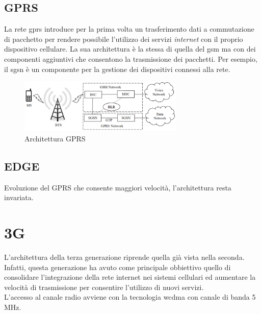 \clearpage

\subsection{GPRS}
La rete \gls{gprs}\cite{gprs-edge} introduce per la prima volta un trasferimento dati a commutazione di pacchetto per rendere 
possibile l'utilizzo dei servizi \textit{internet} con il proprio dispositivo cellulare\cite{gsm-architecture}.
La sua architettura è la stessa di quella del \gls{gsm} ma con dei componenti aggiuntivi che consentono la trasmissione dei pacchetti. 
Per esempio, il \gls{sgsn} è un componente per la gestione dei dispositivi connessi alla rete.
\begin{figure}[ht]
    \centering
    \includegraphics[width=0.7\textwidth]{images/2g-gprs.png}
    \caption{Architettura GPRS}
\end{figure}
\subsection{EDGE}
Evoluzione del GPRS che consente maggiori velocità, l'architettura resta invariata\cite{gprs-edge}.

\clearpage

\section{3G}
L'architettura della terza generazione riprende quella già vista nella seconda. Infatti, questa generazione ha avuto come principale obbiettivo 
quello di consolidare l'integrazione della rete internet nei sistemi cellulari ed aumentare la velocità di trasmissione per consentire l'utilizzo 
di nuovi servizi.\\
L'accesso al canale radio avviene con la tecnologia \gls{wcdma} con canale di banda 5 MHz.

